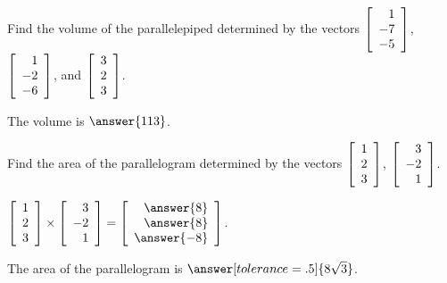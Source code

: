 \documentclass{ximera}
\author{Zack Reed}
\begin{document}
  \begin{problem}
    Find the volume of the parallelepiped determined by the vectors
    $\startmat{r}
      1 \\
      -7 \\
      -5
    \stopmat$,
    $\startmat{r}
      1 \\
      -2 \\
      -6
    \stopmat$, and $\startmat{r}
      3 \\
      2 \\
      3
    \stopmat$.
    
    The volume is $\answer{113}$.
    
  \end{problem}

  
  
  
  
  \begin{problem}
    Find the area of the parallelogram determined by the vectors
    $\startmat{r}
      1 \\
      2 \\
      3
    \stopmat$, $\startmat{r}
      3 \\
      -2 \\
      1
    \stopmat$.

      $\startmat{r}
        1 \\
        2 \\
        3
      \stopmat \times
      \startmat{r}
        3 \\
        -2 \\
        1
      \stopmat = \startmat{r}
        \answer{8} \\
        \answer{8} \\
        \answer{-8}
      \stopmat$. 
      
      The area of the parallelogram is $\answer[tolerance=.5]{8\sqrt{3}}$.
    
  \end{problem}
  
\end{document}
